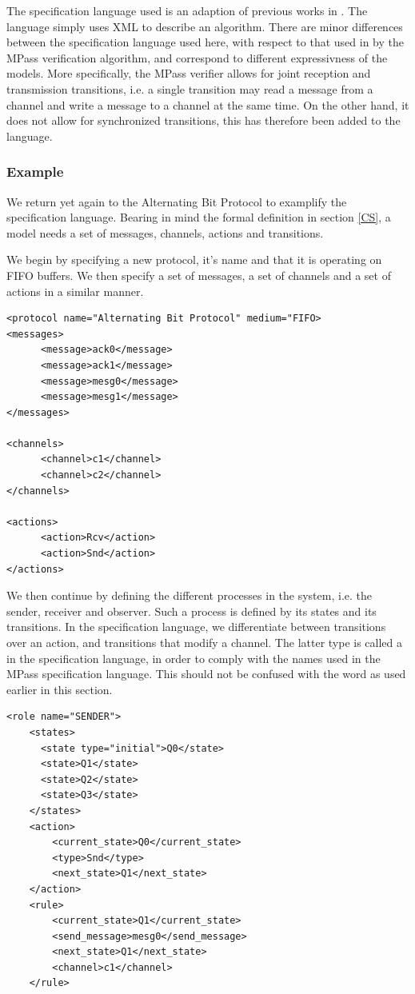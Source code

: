 The specification language used is an adaption of previous works in \cite{mpass}. The language simply uses XML to describe an algorithm. There are minor differences between the specification language used here, with respect to that used in by the MPass verification algorithm, and correspond to different expressivness of the models. More specifically, the MPass verifier allows for joint reception and transmission transitions, i.e. a single transition may read a message from a channel and write a message to a channel at the same time. On the other hand, it does not allow for synchronized transitions, this has therefore been added to the language.

\subsubsection{Example}
We return yet again to the Alternating Bit Protocol to examplify the specification language. Bearing in mind the formal definition in section \ref{CS}, a model needs a set of messages, channels, actions and transitions.

We begin by specifying a new protocol, it's name and that it is operating on FIFO buffers. We then specify a set of messages, a set of channels and a set of actions in a similar manner.

\lstset{language=XML}
\begin{lstlisting}[frame=single]
<protocol name="Alternating Bit Protocol" medium="FIFO>
<messages>
      <message>ack0</message>
      <message>ack1</message>
      <message>mesg0</message>
      <message>mesg1</message>
</messages>

<channels>
      <channel>c1</channel>
      <channel>c2</channel>
</channels>

<actions>
      <action>Rcv</action>
      <action>Snd</action>
</actions>
\end{lstlisting}

We then continue by defining the different processes in the system, i.e. the sender, receiver and observer. Such a process is defined by its states and its transitions. In the specification language, we differentiate between transitions over an action, and transitions that modify a channel. The latter type is called a  in the specification language, in order to comply with the names used in the MPass specification language. This should not be confused with the word as used earlier in this section.

\begin{lstlisting}[frame=single]
  <role name="SENDER">
    <states>
      <state type="initial">Q0</state>
      <state>Q1</state>
      <state>Q2</state>
      <state>Q3</state>
    </states>
    <action>
        <current_state>Q0</current_state>
        <type>Snd</type>
        <next_state>Q1</next_state>
    </action>
    <rule>
        <current_state>Q1</current_state>
        <send_message>mesg0</send_message>
        <next_state>Q1</next_state>
        <channel>c1</channel>
    </rule>
\end{lstlisting}

